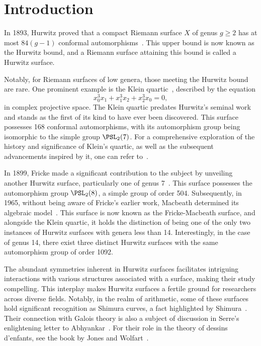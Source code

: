 \maketitle
\section{Introduction}
In 1893, Hurwitz proved that a compact Riemann surface \(X\) of genus \(g \geq 2\) has at most \(84(g - 1)\) conformal automorphisms~\cite{hurwitz1893}.
This upper bound is now known as the Hurwitz bound, and a Riemann surface attaining this bound is called a Hurwitz surface.

Notably, for Riemann surfaces of low genera, those meeting the Hurwitz bound are rare.
One prominent example is the Klein quartic~\cite{Klein79}, described by the equation
\[
x_0^3x_1 + x_1^3x_2 + x_2^3x_0 = 0,
\]
in complex projective space.
The Klein quartic predates Hurwitz's seminal work and stands as the first of its kind to have ever been discovered.
This surface possesses 168 conformal automorphisms, with its automorphism group being isomorphic to the simple group $\PSL_2(7)$.
For a comprehensive exploration of the history and significance of Klein's quartic, as well as the subsequent advancements inspired by it, one can refer to~\cite{MR1722410}.

In 1899, Fricke made a significant contribution to the subject by unveiling another Hurwitz surface, particularly one of genus 7~\cite{MR1511059}.
This surface possesses the automorphism group $\PSL_2(8)$, a simple group of order 504.
Subsequently, in 1965, without being aware of Fricke's earlier work, Macbeath determined its algebraic model~\cite{macbeath1965}. 
This surface is now known as the Fricke-Macbeath surface, and alongside the Klein quartic, it holds the distinction of being one of the only two instances of Hurwitz surfaces with genera less than 14.
Interestingly, in the case of genus 14, there exist three distinct Hurwitz surfaces with the same automorphism group of order 1092.

The abundant symmetries inherent in Hurwitz surfaces facilitates intriguing interactions with various structures associated with a surface, making their study compelling.
This interplay makes Hurwitz surfaces a fertile ground for researchers across diverse fields.
Notably, in the realm of arithmetic, some of these surfaces hold significant recognition as Shimura curves, a fact highlighted by Shimura~\cite{MR0204426}.
Their connection with Galois theory is also a subject of discussion in Serre's enlightening letter to Abhyankar~\cite{MR1272022}.
For their role in the theory of dessins d'enfants, see the book by Jones and Wolfart~\cite{MR3467692}.

